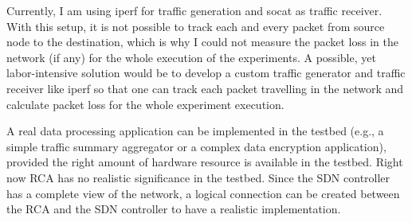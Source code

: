 Currently, I am using iperf for traffic generation and socat as traffic receiver. With this setup, it is not possible to track each and every packet from source node to the destination, which is why I could not measure the packet loss in the network (if any) for the whole execution of the experiments. A possible, yet labor-intensive solution would be to develop a custom traffic generator and traffic receiver like iperf so that one can track each packet travelling in the network and calculate packet loss for the whole experiment execution. 

A real data processing application can be implemented in the testbed (e.g., a simple traffic summary aggregator or a complex data encryption application), provided the right amount of hardware resource is available in the testbed. Right now RCA has no realistic significance in the testbed. Since the SDN controller has a complete view of the network, a logical connection can be created between the RCA and the SDN controller to have a realistic implementation.

\newpage
\thispagestyle{empty}
\mbox{}
